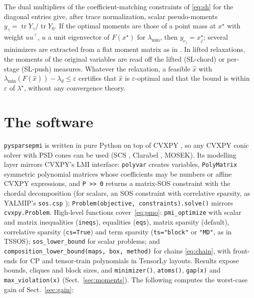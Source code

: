 \documentclass[smallextended]{svjour3}
\newcommand{\lmin}{\lambda_{\min}}
\newcommand{\code}[1]{\texttt{#1}}
\begin{document}
The dual multipliers of the coefficient-matching constraints of
\eqref{eq:sh} for the diagonal entries give, after trace normalization,
scalar pseudo-moments $y_\gamma=\operatorname{tr}Y_\gamma/
\operatorname{tr}Y_0$. If the optimal moments are those of a point mass at
$x^\star$ with weight $uu^\top$, $u$ a unit eigenvector of $F(x^\star)$ for
$\lmin$, then $y_{e_j}=x^\star_j$; several minimizers are extracted from a
flat moment matrix as in \cite{HenrionLasserre2005}. In lifted relaxations, the moments of the
original variables are read off the lifted (SL-chord) or per-stage (SL-push)
measures. Whatever the relaxation, a feasible $\hat x$ with
$\lmin(F(\hat x))-\lambda_d\le\varepsilon$ certifies that $\hat x$ is
$\varepsilon$-optimal and that the bound is within $\varepsilon$ of
$\lambda^\star$, without any convergence theory.

\section{The software}
\label{sec:software}

\code{pysparsepmi} is written in pure Python on top of CVXPY
\cite{CVXPY2016}, so any CVXPY conic solver with PSD cones can be
used (SCS \cite{SCS2016}, Clarabel \cite{Clarabel2026}, MOSEK). Its
modelling layer mirrors CVXPY's LMI interface: \code{polyvar} creates
variables, \code{PolyMatrix} symmetric polynomial matrices whose
coefficients may be numbers or affine CVXPY expressions, and \code{P >> 0}
returns a matrix-SOS constraint with the chordal decomposition (for scalars,
an SOS constraint with correlative sparsity, as YALMIP's \code{sos.csp}
\cite{Lofberg2009}); \code{Problem(objective, constraints).solve()}
mirrors \code{cvxpy.Problem}. High-level functions cover~\eqref{eq:pmo}:
\code{pmi\_optimize} with scalar and matrix inequalities (\code{ineqs}),
equalities (\code{eqs}), matrix sparsity (default), correlative sparsity
(\code{cs=True}) and term sparsity (\code{ts="block"} or \code{"MD"}, as in
TSSOS); \code{sos\_lower\_bound} for scalar problems; and
\code{composition\_lower\_bound(maps, box, method)} for chains
\eqref{eq:chain}, with front-ends for CP and tensor-train polynomials in
TensorLy layouts. Results expose bounds, cliques and block sizes, and
\code{minimizer()}, \code{atoms()}, \code{gap(x)} and
\code{max\_violation(x)} (Sect.~\ref{sec:moments}). The following computes
the worst-case gain of Sect.~\ref{sec:gain}:
\end{document}
